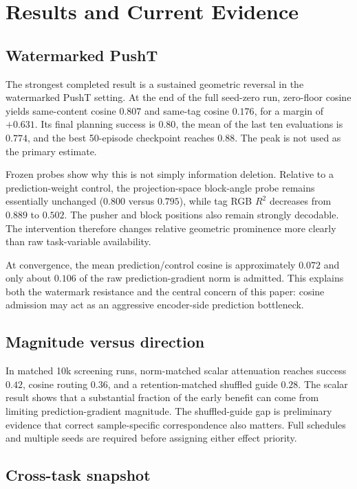 \section{Results and Current Evidence}

\subsection{Watermarked PushT}

The strongest completed result is a sustained geometric reversal in the
watermarked PushT setting.  At the end of the full seed-zero run, zero-floor cosine
\shortmethod{} yields same-content cosine $0.807$ and same-tag cosine $0.176$,
for a margin of $+0.631$.  Its final planning success is $0.80$, the mean of the
last ten evaluations is $0.774$, and the best 50-episode checkpoint reaches
$0.88$.  The peak is not used as the primary estimate.

Frozen probes show why this is not simply information deletion.  Relative to
a prediction-weight control, the projection-space block-angle probe remains
essentially unchanged ($0.800$ versus $0.795$), while tag RGB $R^2$ decreases
from $0.889$ to $0.502$.  The pusher and block positions also remain strongly
decodable.  The intervention therefore changes relative geometric prominence
more clearly than raw task-variable availability.

At convergence, the mean prediction/control cosine is approximately $0.072$
and only about $0.106$ of the raw prediction-gradient norm is admitted.  This
explains both the watermark resistance and the central concern of this paper:
cosine admission may act as an aggressive encoder-side prediction bottleneck.

\subsection{Magnitude versus direction}

In matched 10k screening runs, norm-matched scalar attenuation reaches success
$0.42$, cosine routing $0.36$, and a retention-matched shuffled guide $0.28$.
The scalar result shows that a substantial fraction of the early benefit can
come from limiting prediction-gradient magnitude.  The shuffled-guide gap is
preliminary evidence that correct sample-specific correspondence also matters.
Full schedules and multiple seeds are required before assigning either effect
priority.

\subsection{Cross-task snapshot}

